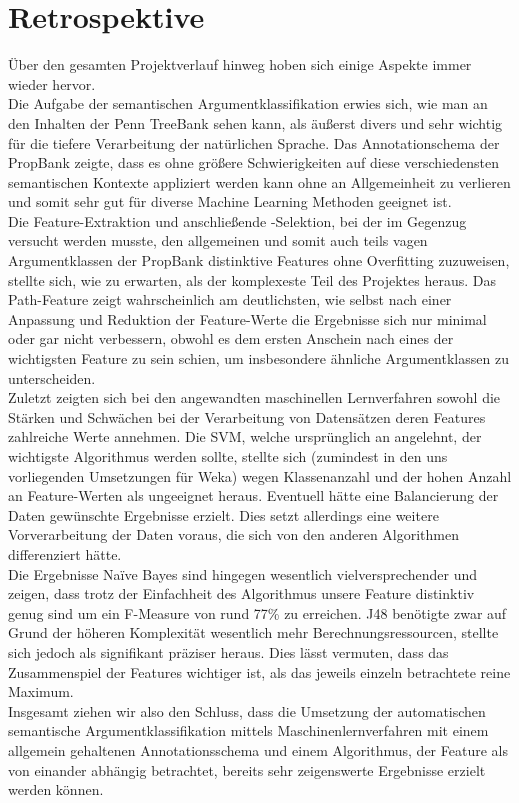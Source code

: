 \documentclass[]{article}
\begin{document}
\section{Retrospektive}
Über den gesamten Projektverlauf hinweg hoben sich einige Aspekte immer wieder hervor.\\
Die Aufgabe der semantischen Argumentklassifikation erwies sich, wie man an den Inhalten der Penn TreeBank sehen kann, als äußerst divers und sehr wichtig für die tiefere Verarbeitung der natürlichen Sprache. Das Annotationschema der PropBank zeigte, dass es ohne größere Schwierigkeiten auf diese verschiedensten semantischen Kontexte appliziert werden kann ohne an Allgemeinheit zu verlieren und somit sehr gut für diverse Machine Learning Methoden geeignet ist.\\
Die Feature-Extraktion und anschließende -Selektion, bei der im Gegenzug versucht werden musste, den allgemeinen und somit auch teils vagen Argumentklassen der PropBank distinktive Features ohne Overfitting zuzuweisen, stellte sich, wie zu erwarten, als der komplexeste Teil des Projektes heraus. Das Path-Feature zeigt wahrscheinlich am deutlichsten, wie selbst nach einer Anpassung und Reduktion der Feature-Werte die Ergebnisse sich nur minimal oder gar nicht verbessern, obwohl es dem ersten Anschein nach eines der wichtigsten Feature zu sein schien, um insbesondere ähnliche Argumentklassen zu unterscheiden.\\
Zuletzt zeigten sich bei den angewandten maschinellen Lernverfahren sowohl die Stärken und Schwächen bei der Verarbeitung von Datensätzen deren Features zahlreiche Werte annehmen. Die SVM, welche ursprünglich an \cite{Pradhan05supportvector} angelehnt, der wichtigste Algorithmus werden sollte, stellte sich (zumindest in den uns vorliegenden Umsetzungen für Weka) wegen Klassenanzahl und der hohen Anzahl an Feature-Werten als ungeeignet heraus. Eventuell hätte eine Balancierung der Daten gewünschte Ergebnisse erzielt. Dies setzt allerdings eine weitere Vorverarbeitung der Daten voraus, die sich von den anderen Algorithmen differenziert hätte.\\
Die Ergebnisse Naïve Bayes sind hingegen wesentlich vielversprechender und zeigen, dass trotz der Einfachheit des Algorithmus unsere Feature distinktiv genug sind um ein F-Measure von rund 77\% zu erreichen. J48 benötigte zwar auf Grund der höheren Komplexität wesentlich mehr Berechnungsressourcen, stellte sich jedoch als signifikant präziser heraus. Dies lässt vermuten, dass das Zusammenspiel der Features wichtiger ist, als das jeweils einzeln betrachtete reine Maximum.\\
Insgesamt ziehen wir also den Schluss, dass die Umsetzung der automatischen semantische Argumentklassifikation mittels Maschinenlernverfahren mit einem allgemein gehaltenen Annotationsschema und einem Algorithmus, der Feature als von einander abhängig betrachtet, bereits sehr zeigenswerte Ergebnisse erzielt werden können.





\end{document}

